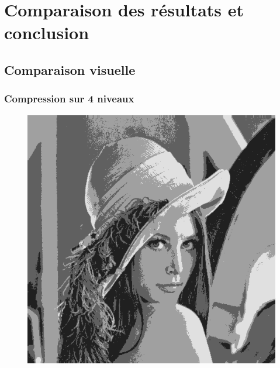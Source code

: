 \documentclass[a4paper, 12pt]{article}
\begin{document}
	\section{Comparaison des résultats et conclusion}
	\subsection{Comparaison visuelle}
	\subsubsection{Compression sur 4 niveaux}
	\begin{figure}[ht!]
	    \centering
    	\begin{minipage}[b]{0.3\linewidth}
    	    \includegraphics[scale=0.3]{resources/png/naive4.png}
        \end{minipage}\hfill
        \begin{minipage}[b]{0.3\linewidth}

\end{minipage}
\end{figure}
\end{document}
